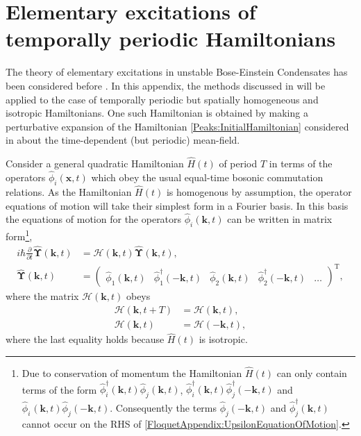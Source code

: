 \chapter{Elementary excitations of temporally periodic Hamiltonians}
\label{FloquetAppendix}
\graphicspath{{Figures/FloquetAppendix/}{Figures/Common/}}

The theory of elementary excitations in unstable Bose-Einstein Condensates has been considered before \citep{Leonhardt:2003}. In this appendix, the methods discussed in \citep{Leonhardt:2003} will be applied to the case of temporally periodic but spatially homogeneous and isotropic Hamiltonians. One such Hamiltonian is obtained by making a perturbative expansion of the Hamiltonian \eqref{Peaks:InitialHamiltonian} considered in  about the time-dependent (but periodic) mean-field.

Consider a general quadratic Hamiltonian $\hat{H}(t)$ of period $T$ in terms of the operators $\hat{\phi}_i(\bm{x}, t)$ which obey the usual equal-time bosonic commutation relations. As the Hamiltonian $\hat{H}(t)$ is homogenous by assumption, the operator equations of motion will take their simplest form in a Fourier basis. In this basis the equations of motion for the operators $\hat{\phi}_i(\bm{k}, t)$ can be written in matrix form\footnote{Due to conservation of momentum the Hamiltonian $\hat{H}(t)$ can only contain terms of the form $\hat{\phi}_i^\dagger(\bm{k}, t) \hat{\phi}_j^{\phantom{\dagger}}(\bm{k}, t)$, $\hat{\phi}_i^\dagger(\bm{k}, t) \hat{\phi}_j^{\dagger}(-\bm{k}, t)$ and $\hat{\phi}_i^{\phantom{\dagger}}(\bm{k}, t) \hat{\phi}_j^{\phantom{\dagger}}(-\bm{k}, t)$. Consequently the terms $\hat{\phi}_j(-\bm{k}, t)$ and $\hat{\phi}_j^\dagger(\bm{k}, t)$ cannot occur on the RHS of \eqref{FloquetAppendix:UpsilonEquationOfMotion}.},
\begin{subequations}
    \label{FloquetAppendix:MatrixOperatorEvolution}
    \begin{align}
        i \hbar \frac{\partial }{\partial t}\hat{\bm{\Upsilon}}(\bm{k}, t) &= \mathcal{H}(\bm{k}, t) \hat{\bm{\Upsilon}}(\bm{k}, t), \label{FloquetAppendix:UpsilonEquationOfMotion}\\
        \hat{\bm{\Upsilon}}(\bm{k}, t) &= 
        \begin{pmatrix}
            \hat{\phi}_1^{\phantom{\dagger}}(\bm{k}, t) &
            \hat{\phi}_1^\dagger(-\bm{k}, t) &
            \hat{\phi}_2^{\phantom{\dagger}}(\bm{k}, t) &
            \hat{\phi}_2^\dagger(-\bm{k}, t) &
            \dots
        \end{pmatrix}^\text{T},
    \end{align}
\end{subequations}
where the matrix $\mathcal{H}(\bm{k}, t)$ obeys
\begin{align}
        \mathcal{H}(\bm{k}, t+T) &= \mathcal{H}(\bm{k}, t),\\
        \mathcal{H}(\bm{k}, t) &= \mathcal{H}(-\bm{k}, t), \label{FloquetAppendix:HReflectionSymmetry}
\end{align}
where the last equality holds because $\hat{H}(t)$ is isotropic.


